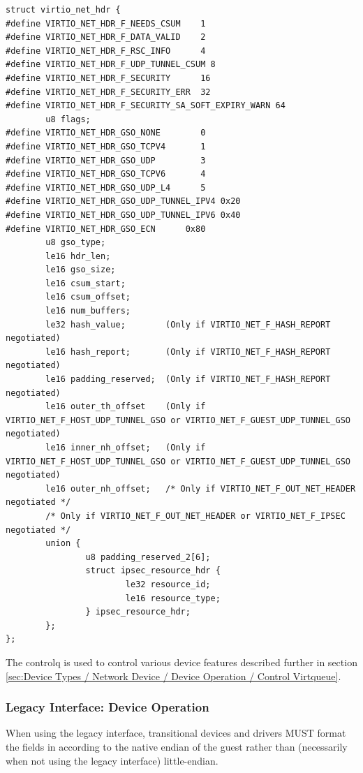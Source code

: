 \begin{lstlisting}
struct virtio_net_hdr {
#define VIRTIO_NET_HDR_F_NEEDS_CSUM    1
#define VIRTIO_NET_HDR_F_DATA_VALID    2
#define VIRTIO_NET_HDR_F_RSC_INFO      4
#define VIRTIO_NET_HDR_F_UDP_TUNNEL_CSUM 8
#define VIRTIO_NET_HDR_F_SECURITY      16
#define VIRTIO_NET_HDR_F_SECURITY_ERR  32
#define VIRTIO_NET_HDR_F_SECURITY_SA_SOFT_EXPIRY_WARN 64
        u8 flags;
#define VIRTIO_NET_HDR_GSO_NONE        0
#define VIRTIO_NET_HDR_GSO_TCPV4       1
#define VIRTIO_NET_HDR_GSO_UDP         3
#define VIRTIO_NET_HDR_GSO_TCPV6       4
#define VIRTIO_NET_HDR_GSO_UDP_L4      5
#define VIRTIO_NET_HDR_GSO_UDP_TUNNEL_IPV4 0x20
#define VIRTIO_NET_HDR_GSO_UDP_TUNNEL_IPV6 0x40
#define VIRTIO_NET_HDR_GSO_ECN      0x80
        u8 gso_type;
        le16 hdr_len;
        le16 gso_size;
        le16 csum_start;
        le16 csum_offset;
        le16 num_buffers;
        le32 hash_value;        (Only if VIRTIO_NET_F_HASH_REPORT negotiated)
        le16 hash_report;       (Only if VIRTIO_NET_F_HASH_REPORT negotiated)
        le16 padding_reserved;  (Only if VIRTIO_NET_F_HASH_REPORT negotiated)
        le16 outer_th_offset    (Only if VIRTIO_NET_F_HOST_UDP_TUNNEL_GSO or VIRTIO_NET_F_GUEST_UDP_TUNNEL_GSO negotiated)
        le16 inner_nh_offset;   (Only if VIRTIO_NET_F_HOST_UDP_TUNNEL_GSO or VIRTIO_NET_F_GUEST_UDP_TUNNEL_GSO negotiated)
        le16 outer_nh_offset;   /* Only if VIRTIO_NET_F_OUT_NET_HEADER negotiated */
        /* Only if VIRTIO_NET_F_OUT_NET_HEADER or VIRTIO_NET_F_IPSEC negotiated */
        union {
                u8 padding_reserved_2[6];
                struct ipsec_resource_hdr {
                        le32 resource_id;
                        le16 resource_type;
                } ipsec_resource_hdr;
        };
};
\end{lstlisting}

The controlq is used to control various device features described further in
section \ref{sec:Device Types / Network Device / Device Operation / Control Virtqueue}.

\subsubsection{Legacy Interface: Device Operation}\label{sec:Device Types / Network Device / Device Operation / Legacy Interface: Device Operation}
When using the legacy interface, transitional devices and drivers
MUST format the fields in 
according to the native endian of the guest rather than
(necessarily when not using the legacy interface) little-endian.

